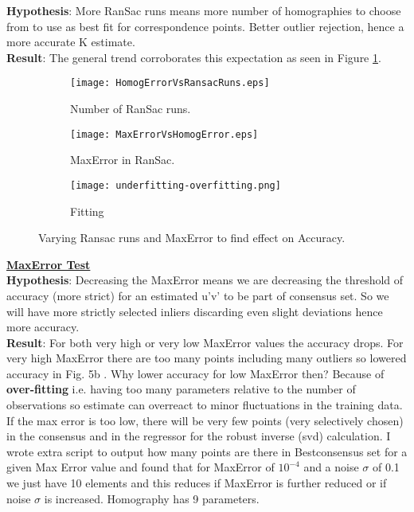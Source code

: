 \documentclass[titlepage]{article}
\begin{document}
\textbf{Hypothesis}: More RanSac runs means more number of homographies to choose from to use as best fit for correspondence points. Better outlier rejection, hence a more accurate K estimate.  \\
\textbf{Result}: The general trend corroborates this expectation as seen in Figure \ref{RansacRunsVsAccuracy}.
\begin{figure}[H]
\begin{subfigure}{0.25\textwidth}
\texttt{[image: HomogErrorVsRansacRuns.eps]}
\caption{Number of RanSac runs.}
\label{RansacRunsVsAccuracy}
\end{subfigure}
\begin{subfigure}{0.25\textwidth}
\texttt{[image: MaxErrorVsHomogError.eps]}
\caption{MaxError in RanSac.}
\label{MaxErrorVsAccuracy}
\end{subfigure} 
\begin{subfigure}{0.25\textwidth}
\texttt{[image: underfitting-overfitting.png]}
\caption{Fitting}
\label{Fit}
\end{subfigure} 
\caption{Varying Ransac runs and MaxError to find effect on Accuracy.}
\end{figure}
\textbf{\underline{MaxError Test}}\\
\textbf{Hypothesis}: Decreasing the MaxError means we are decreasing the threshold of accuracy (more strict) for an estimated u'v' to be part of consensus set. So we will have more strictly selected inliers discarding even slight deviations hence more accuracy.\\
\textbf{Result}: For both very high or very low MaxError values the accuracy drops. For very high MaxError there are too many points including many outliers so lowered accuracy in Fig. 5b . Why lower accuracy for low MaxError then? Because of \textbf{over-fitting} i.e. having too many parameters relative to the number of observations so estimate can overreact to minor fluctuations in the training data. If the max error is too low, there will be very few points (very selectively chosen) in the consensus and in the regressor for the robust inverse (svd) calculation. I wrote extra script to output how many points are there in Bestconsensus set for a given Max Error value and found that for MaxError of $10^{-4}$ and a noise $\sigma$ of 0.1 we just have 10 elements and this reduces if MaxError is further reduced or if noise $\sigma$ is increased. Homography has 9 parameters.
\bigskip
\end{document}
